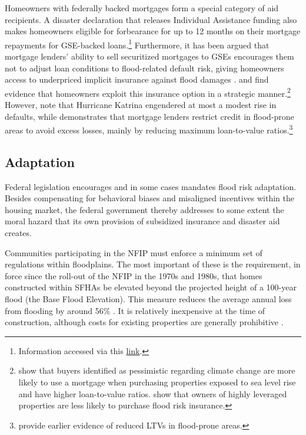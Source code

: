 \documentclass[12pt]{article}
\begin{document}
Homeowners with federally backed mortgages form a special category of aid recipients. A disaster declaration that releases Individual Assistance funding also makes homeowners eligible for forbearance for up to 12 months on their mortgage repayments for GSE-backed loans.\footnote{Information accessed via this \href{https://www.fhfa.gov/homeowners-and-homebuyers/mortgage-assistance/disaster-assistance}{link}.} Furthermore, it has been argued that mortgage lenders' ability to sell securitized mortgages to GSEs encourages them not to adjust loan conditions to flood-related default risk, giving homeowners access to underpriced implicit insurance against flood damages  \citep{keenan2020underwaterwriting,sastry2023insurers}. \cite{bakkensen2025leveraging} and \cite{liaomulder2026homeequity} find evidence that homeowners exploit this insurance option in a strategic manner.\footnote{\cite{bakkensen2025leveraging} show that buyers identified as pessimistic regarding climate change are more likely to use a mortgage when purchasing properties exposed to sea level rise and have higher loan-to-value ratios. \cite{liaomulder2026homeequity} show that owners of highly leveraged properties are less likely to purchase flood risk insurance.} However, \cite{gallagher2017household} note that Hurricane Katrina engendered at most a modest rise in defaults, while \cite{sastry2026bears} demonstrates that mortgage lenders restrict credit in flood-prone areas to avoid excess losses, mainly by reducing maximum loan-to-value ratios.\footnote{\cite{nguyen2022climate} provide earlier evidence of reduced LTVs in flood-prone areas.} 

\subsection{Adaptation}

Federal legislation encourages and in some cases mandates flood risk adaptation. Besides compensating for behavioral biases and misaligned incentives within the housing market, the federal government thereby addresses to some extent the moral hazard that its own provision of subsidized insurance and disaster aid creates. 

Communities participating in the NFIP must enforce a minimum set of regulations within floodplains. The most important of these is the requirement, in force since the roll-out of the NFIP in the 1970s and 1980s, that homes constructed within SFHAs be elevated beyond the projected height of a 100-year flood (the Base Flood Elevation). This measure reduces the average annual loss from flooding by around 56\% \citep{ostriker2022effects}. It is relatively inexpensive at the time of construction, although costs for existing properties are generally prohibitive \citep{botzen2019adoption}.   
\end{document}

